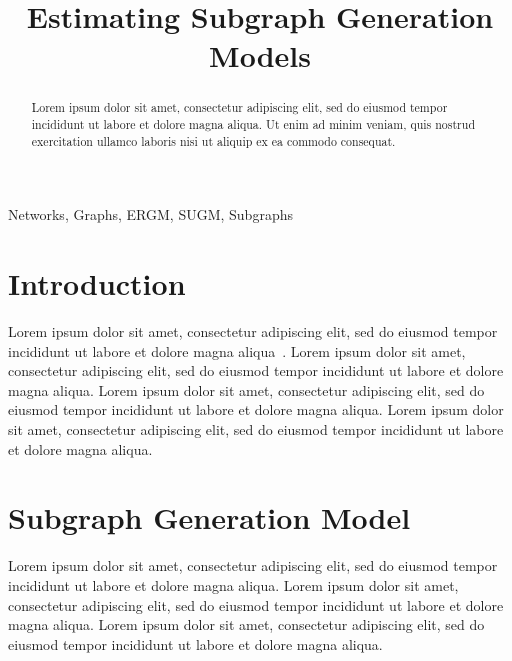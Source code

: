 \documentclass[conference]{IEEEtran}
\begin{document}
\title{Estimating Subgraph Generation Models}

\author{
\and
{}
}

\maketitle

\begin{abstract}
Lorem ipsum dolor sit amet, consectetur adipiscing elit, sed do eiusmod tempor incididunt ut labore et dolore magna aliqua. Ut enim ad minim veniam, quis nostrud exercitation ullamco laboris nisi ut aliquip ex ea commodo consequat.
\end{abstract}

\begin{IEEEkeywords}
Networks, Graphs, ERGM, SUGM, Subgraphs
\end{IEEEkeywords}

\section{Introduction}

Lorem ipsum dolor sit amet, consectetur adipiscing elit, sed do eiusmod tempor incididunt ut labore et dolore magna aliqua~\cite{Chandrasekhar2014}.
Lorem ipsum dolor sit amet, consectetur adipiscing elit, sed do eiusmod tempor incididunt ut labore et dolore magna aliqua.
Lorem ipsum dolor sit amet, consectetur adipiscing elit, sed do eiusmod tempor incididunt ut labore et dolore magna aliqua.
Lorem ipsum dolor sit amet, consectetur adipiscing elit, sed do eiusmod tempor incididunt ut labore et dolore magna aliqua.

\section{Subgraph Generation Model}

Lorem ipsum dolor sit amet, consectetur adipiscing elit, sed do eiusmod tempor incididunt ut labore et dolore magna aliqua.
Lorem ipsum dolor sit amet, consectetur adipiscing elit, sed do eiusmod tempor incididunt ut labore et dolore magna aliqua.
Lorem ipsum dolor sit amet, consectetur adipiscing elit, sed do eiusmod tempor incididunt ut labore et dolore magna aliqua.
\end{document}
